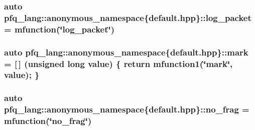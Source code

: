 \hypertarget{namespacepfq__lang_1_1anonymous__namespace_02default_8hpp_03_a82a9b0e4c53eb28a98e5c34372a5b17b}{
\subsubsection[{log\+\_\+packet}]{\setlength{\rightskip}{0pt plus 5cm}auto pfq\+\_\+lang\+::anonymous\+\_\+namespace\{default.\+hpp\}\+::log\+\_\+packet = {\bf mfunction}(\char`\"{}log\+\_\+packet\char`\"{})}}\label{namespacepfq__lang_1_1anonymous__namespace_02default_8hpp_03_a82a9b0e4c53eb28a98e5c34372a5b17b}
\hypertarget{namespacepfq__lang_1_1anonymous__namespace_02default_8hpp_03_ad6142fe3a0fc859f25ea16956f52a5f0}{
\subsubsection[{mark}]{\setlength{\rightskip}{0pt plus 5cm}auto pfq\+\_\+lang\+::anonymous\+\_\+namespace\{default.\+hpp\}\+::mark = \mbox{[}$\,$\mbox{]} (unsigned long value) \{ return {\bf mfunction1}(\char`\"{}mark\char`\"{}, value); \}}}\label{namespacepfq__lang_1_1anonymous__namespace_02default_8hpp_03_ad6142fe3a0fc859f25ea16956f52a5f0}
\hypertarget{namespacepfq__lang_1_1anonymous__namespace_02default_8hpp_03_a60b130b2b5a08d0c83063ed584b79396}{
\subsubsection[{no\+\_\+frag}]{\setlength{\rightskip}{0pt plus 5cm}auto pfq\+\_\+lang\+::anonymous\+\_\+namespace\{default.\+hpp\}\+::no\+\_\+frag = {\bf mfunction}(\char`\"{}no\+\_\+frag\char`\"{})}}\label{namespacepfq__lang_1_1anonymous__namespace_02default_8hpp_03_a60b130b2b5a08d0c83063ed584b79396}

